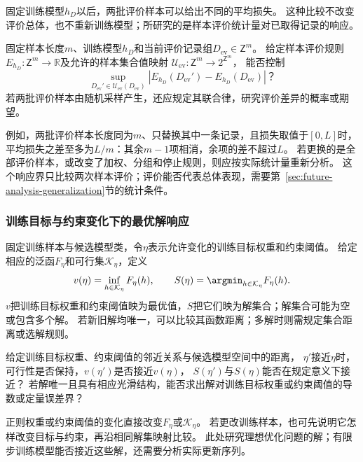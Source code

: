 固定训练模型$h_D$以后，两批评价样本可以给出不同的平均损失。
这种比较不改变评价总体，也不重新训练模型；所研究的是样本评价统计量对已取得记录的响应。

\begin{mathproblem}[评价样本变换造成的评价差异]
  \label{question:future-evaluation-sample-response}
  固定样本长度$m$、训练模型$h_D$和当前评价记录组$D_{\mathrm{ev}}\in\mathsf Z^m$。
  给定样本评价规则$E_{h_D}:\mathsf Z^m\to\mathbb R$及允许的样本集合值映射
  $\mathcal U_{\mathrm{ev}}:\mathsf Z^m\to2^{\mathsf Z^m}$，
  能否控制
  \[
    \sup_{D_{\mathrm{ev}}'\in\mathcal U_{\mathrm{ev}}(D_{\mathrm{ev}})}
      |E_{h_D}(D_{\mathrm{ev}}')-E_{h_D}(D_{\mathrm{ev}})|\text{？}
  \]
  若两批评价样本由随机采样产生，还应规定其联合律，研究评价差异的概率或期望。
\end{mathproblem}

例如，两批评价样本长度同为$m$、只替换其中一条记录，且损失取值于$[0,L]$时，
平均损失之差至多为$L/m$：其余$m-1$项相消，余项的差不超过$L$。
若更换的是全部评价样本，或改变了加权、分组和停止规则，则应按实际统计量重新分析。
这个响应界只比较两次样本评价；评价能否代表总体表现，需要第~\ref{sec:future-analysis-generalization}节的统计条件。

\subsubsection{训练目标与约束变化下的最优解响应}
\label{sec:future-analysis-solution-sensitivity}

固定训练样本与候选模型类，令$\eta$表示允许变化的训练目标权重和约束阈值。
给定相应的泛函$F_\eta$和可行集$\mathcal K_\eta$，定义
\[
  v(\eta)=\inf_{h\in\mathcal K_\eta}F_\eta(h),\qquad
  S(\eta)=\argmin_{h\in\mathcal K_\eta}F_\eta(h).
\]
$v$把训练目标权重和约束阈值映为最优值，$S$把它们映为解集合；解集合可能为空或包含多个解。
若新旧解均唯一，可以比较其函数距离；多解时则需规定集合距离或选解规则。

\begin{mathproblem}[训练目标与约束变化造成的最优值与解集差异]
  \label{question:future-solution-sensitivity}
  给定训练目标权重、约束阈值的邻近关系与候选模型空间中的距离，
  $\eta'$接近$\eta$时，可行性是否保持，$v(\eta')$是否接近$v(\eta)$，
  $S(\eta')$与$S(\eta)$能否在规定意义下接近？
  若解唯一且具有相应光滑结构，能否求出解对训练目标权重或约束阈值的导数或定量误差界？
\end{mathproblem}

正则权重或约束阈值的变化直接改变$F_\eta$或$\mathcal K_\eta$。
若更改训练样本，也可先说明它怎样改变目标与约束，再沿相同解集映射比较。
此处研究理想优化问题的解；有限步训练模型能否接近这些解，还需要分析实际更新序列。


